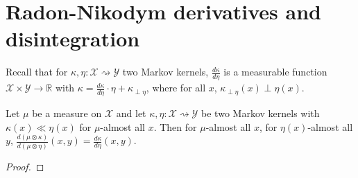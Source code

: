 \chapter{Radon-Nikodym derivatives and disintegration}

Recall that for $\kappa, \eta : \mathcal X \rightsquigarrow \mathcal Y$ two Markov kernels, $\frac{d \kappa}{d \eta}$ is a measurable function $\mathcal X \times \mathcal Y \to \mathbb{R}$ with $\kappa = \frac{d \kappa}{d \eta} \cdot \eta + \kappa_{\perp \eta}$, where for all $x$, $\kappa_{\perp \eta}(x) \perp \eta(x)$.

\begin{lemma}
  \label{lem:rnDeriv_compProd}
  Let $\mu$ be a measure on $\mathcal X$ and let $\kappa, \eta : \mathcal X \rightsquigarrow \mathcal Y$ be two Markov kernels with $\kappa(x) \ll \eta(x)$ for $\mu$-almost all $x$. Then for $\mu$-almost all $x$, for $\eta(x)$-almost all $y$, $\frac{d (\mu \otimes \kappa)}{d (\mu \otimes \eta)}(x,y) = \frac{d \kappa}{d \eta}(x,y)$.
\end{lemma}

\begin{proof}
\end{proof}
